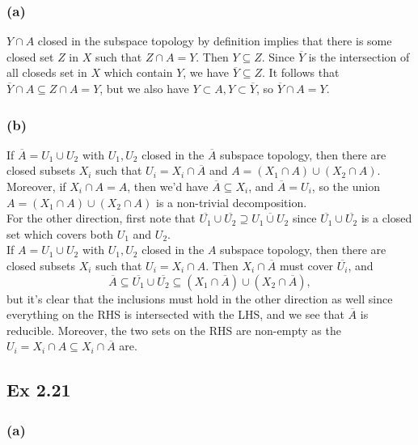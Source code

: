 \documentclass{article}
\theoremstyle{definition}
\begin{document}
\subsubsection*{(a)}

$Y \cap A$ closed in the subspace topology by definition implies that there is
some closed set $Z$ in $X$ such that $Z \cap A = Y$. Then $Y \subseteq Z$.
Since $\overline{Y}$ is the intersection of all closeds set in $X$ which
contain $Y$, we have $\overline{Y} \subseteq Z$. It follows that $\overline{Y}
\cap A \subseteq Z \cap A = Y$, but we also have $Y \subset A, Y \subset
\overline{Y}$, so $\overline{Y} \cap A = Y$.

\subsubsection*{(b)}

If $\overline{A} = U_1 \cup U_2$ with $U_1, U_2$ closed in the $\overline{A}$
subspace topology, then there are closed subsets $X_i$ such that $U_i = X_i
\cap \overline{A}$ and $A = (X_1 \cap A) \cup (X_2 \cap A)$. Moreover, if $X_i
\cap A = A$, then we'd have $\overline{A} \subseteq X_i$, and $\overline{A} =
U_i$, so the union $A = (X_1 \cap A) \cup (X_2 \cap A)$ is a non-trivial
decomposition. \\

For the other direction, first note that $\overline{U_1} \cup \overline{U_2}
\supseteq \overline{U_1 \cup U_2}$ since $\overline{U_1} \cup \overline{U_2}$
is a closed set which covers both $U_1$ and $U_2$. \\

If $A = U_1 \cup U_2$ with $U_1, U_2$ closed in the $A$ subspace topology, then
there are closed subsets $X_i$ such that $U_i = X_i \cap A$. Then $X_i \cap
\overline{A}$ must cover $\overline{U_i}$, and 
\[
	\overline{A} 
	\subseteq 
	\overline{U_1} \cup \overline{U_2} 
	\subseteq 
	(X_1 \cap \overline{A}) \cup (X_2 \cap \overline{A}),
\] 
but it's clear that the inclusions must hold in the other direction as well
since everything on the RHS is intersected with the LHS, and we see that
$\overline{A}$ is reducible. Moreover, the two sets on the RHS are non-empty as
the $U_i = X_i \cap A \subseteq X_i \cap \overline{A}$ are.

\subsection*{Ex 2.21}

\subsubsection*{(a)}
\end{document}
